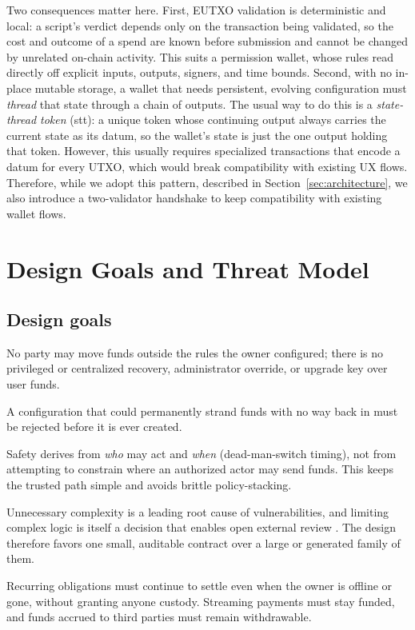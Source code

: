 \documentclass[11pt,DIV=11,parskip=half-]{scrartcl}
\begin{document}
Two consequences matter here. First, EUTXO validation is deterministic and local: a script's verdict depends only on the transaction being validated, so the cost and outcome of a spend are known before submission and cannot be changed by unrelated on-chain activity. This suits a permission wallet, whose rules read directly off explicit inputs, outputs, signers, and time bounds. Second, with no in-place mutable storage, a wallet that needs persistent, evolving configuration must \emph{thread} that state through a chain of outputs. The usual way to do this is a \emph{state-thread token} (\gls{stt}): a unique token whose continuing output always carries the current state as its datum, so the wallet's state is just the one output holding that token. However, this usually requires specialized transactions that encode a datum for every UTXO, which would break compatibility with existing UX flows. Therefore, while we adopt this pattern, described in Section~\ref{sec:architecture}, we also introduce a two-validator handshake to keep compatibility with existing wallet flows.

\section{Design Goals and Threat Model}
\label{sec:goals}

\subsection{Design goals}
\begin{description}[leftmargin=1.4em,style=nextline]
\item[G1 --- Self-custody preserved.] No party may move funds outside the rules the owner configured; there is no privileged or centralized recovery, administrator override, or upgrade key over user funds.
\item[G2 --- Recovery is reachable.] A configuration that could permanently strand funds with no way back in must be rejected before it is ever created.
\item[G3 --- Authorization over restriction.] Safety derives from \emph{who} may act and \emph{when} (dead-man-switch timing), not from attempting to constrain where an authorized actor may send funds. This keeps the trusted path simple and avoids brittle policy-stacking.
\item[G4 --- Simplicity as a security property.] Unnecessary complexity is a leading root cause of vulnerabilities, and limiting complex logic is itself a decision that enables open external review \cite{ncscProtocol}. The design therefore favors one small, auditable contract over a large or generated family of them.
\item[G5 --- Liveness without custody.] Recurring obligations must continue to settle even when the owner is offline or gone, without granting anyone custody. Streaming payments must stay funded, and funds accrued to third parties must remain withdrawable.
\end{description}
\end{document}
